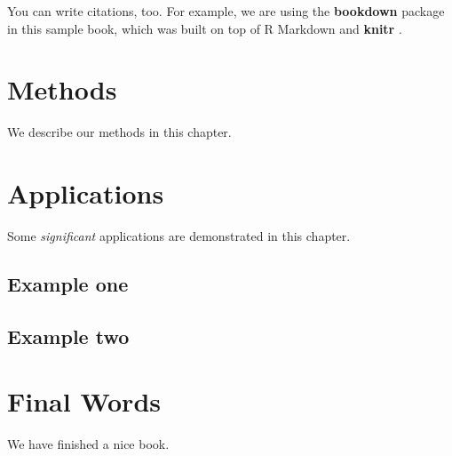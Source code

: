 \documentclass[]{book}
\begin{document}
You can write citations, too. For example, we are using the \textbf{bookdown} package \citep{R-bookdown} in this sample book, which was built on top of R Markdown and \textbf{knitr} \citep{xie2015}.

\hypertarget{methods}{%
\chapter{Methods}\label{methods}}

We describe our methods in this chapter.

\hypertarget{applications}{%
\chapter{Applications}\label{applications}}

Some \emph{significant} applications are demonstrated in this chapter.

\hypertarget{example-one}{%
\section{Example one}\label{example-one}}

\hypertarget{example-two}{%
\section{Example two}\label{example-two}}

\hypertarget{final-words}{%
\chapter{Final Words}\label{final-words}}

We have finished a nice book.


\end{document}
